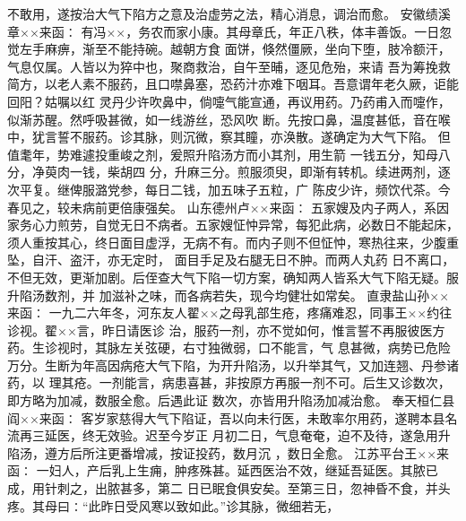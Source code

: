 \documentclass[a4paper,12pt,UTF8,twoside]{ctexbook}
\begin{document}
不敢用，遂按治大气下陷方之意及治虚劳之法，精心消息，调治而愈。 
安徽绩溪章××来函∶ 
有冯××，务农而家小康。其母章氏，年正八秩，体丰善饭。一日忽觉左手麻痹，渐至不能持碗。越朝方食 
面饼，倏然僵厥，坐向下堕，肢冷额汗，气息仅属。人皆以为猝中也，聚商救治，自午至晡，逐见危殆，来请 
吾为筹挽救简方，以老人素不服药，且口噤鼻塞，恐药汁亦难下咽耳。吾意谓年老久厥，讵能回阳？姑嘱以红 
灵丹少许吹鼻中，倘嚏气能宣通，再议用药。乃药甫入而嚏作，似渐苏醒。然呼吸甚微，如一线游丝，恐风吹 
断。先按口鼻，温度甚低，音在喉中，犹言誓不服药。诊其脉，则沉微，察其瞳，亦涣散。遂确定为大气下陷。 
但值耄年，势难遽投重峻之剂，爰照升陷汤方而小其剂，用生箭 一钱五分，知母八分，净萸肉一钱，柴胡四 
分，升麻三分。煎服须臾，即渐有转机。续进两剂，逐次平复。继俾服潞党参，每日二钱，加五味子五粒，广 
陈皮少许，频饮代茶。今春见之，较未病前更倍康强矣。 
山东德州卢××来函∶ 
五家嫂及内子两人，系因家务心力煎劳，自觉无日不病者。五家嫂怔忡异常，每犯此病，必数日不能起床， 
须人重按其心，终日面目虚浮，无病不有。而内子则不但怔忡，寒热往来，少腹重坠，自汗、盗汗，亦无定时， 
面目手足及右腿无日不肿。而两人丸药 
日不离口，不但无效，更渐加剧。后侄查大气下陷一切方案，确知两人皆系大气下陷无疑。服升陷汤数剂，并 
加滋补之味，而各病若失，现今均健壮如常矣。 
直隶盐山孙××来函∶ 
一九二六年冬，河东友人翟××之母乳部生疮，疼痛难忍，同事王××约往诊视。翟××言，昨日请医诊 
治，服药一剂，亦不觉如何，惟言誓不再服彼医方药。生诊视时，其脉左关弦硬，右寸独微弱，口不能言，气 
息甚微，病势已危险万分。生断为年高因病疮大气下陷，为开升陷汤，以升举其气，又加连翘、丹参诸药，以 
理其疮。一剂能言，病患喜甚，非按原方再服一剂不可。后生又诊数次，即方略为加减，数服全愈。后遇此证 
数次，亦皆用升陷汤加减治愈。 
奉天桓仁县阎××来函∶ 
客岁家慈得大气下陷证，吾以向未行医，未敢率尔用药，遂聘本县名流再三延医，终无效验。迟至今岁正 
月初二日，气息奄奄，迫不及待，遂急用升陷汤，遵方后所注更番增减，按证投药，数月沉 ，数日全愈。 
江苏平台王××来函∶ 
一妇人，产后乳上生痈，肿疼殊甚。延西医治不效，继延吾延医。其脓已成，用针刺之，出脓甚多，第二 
日已眠食俱安矣。至第三日，忽神昏不食，并头疼。其母曰∶“此昨日受风寒以致如此。”诊其脉，微细若无， 
\end{document}
